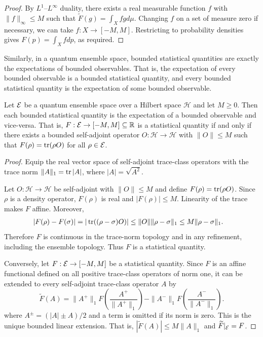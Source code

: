 \begin{mathSection}
\begin{proof}
	By $L^1$--$L^\infty$ duality, there exists a real measurable function $f$ with $\|f\|_\infty \leq M$ such that $\widetilde{F}(g)=\int_X f g d\mu$. Changing $f$ on a set of measure zero if necessary, we can take $f : X \to [-M,M]$. Restricting to probability densities gives $F(p)=\int_X f dp$, as required.
\end{proof}
\end{mathSection}

Similarly, in a quantum ensemble space, bounded statistical quantities are exactly the expectations of bounded observables. That is, the expectation of every bounded observable is a bounded statistical quantity, and every bounded statistical quantity is the expectation of some bounded observable.

\begin{mathSection}
\begin{prop}
	Let $\mathcal{E}$ be a quantum ensemble space over a Hilbert space $\mathcal{H}$ and let $M \geq 0$. Then each bounded statistical quantity is the expectation of a bounded observable and vice-versa. That is, $F : \mathcal{E} \to [-M,M] \subseteq \mathbb{R}$ is a statistical quantity if and only if there exists a bounded self-adjoint operator $O : \mathcal{H} \to \mathcal{H}$ with $\|O\| \leq M$ such that $F(\rho) = \operatorname{tr}(\rho O)$ for all $\rho \in \mathcal{E}$.
\end{prop}

\begin{proof}
	Equip the real vector space of self-adjoint trace-class operators with the trace norm $\|A\|_1=\operatorname{tr} |A|$, where $|A|=\sqrt{A^2}$.
	
	Let $O : \mathcal{H} \to \mathcal{H}$ be self-adjoint with $\|O\| \leq M$ and define $F(\rho)=\operatorname{tr}(\rho O)$. Since $\rho$ is a density operator, $F(\rho)$ is real and $|F(\rho)| \leq M$. Linearity of the trace makes $F$ affine. Moreover,
	\begin{equation}
		\begin{aligned}
			|F(\rho)-F(\sigma)| &= |\operatorname{tr}((\rho-\sigma)O)| \leq \|O\| \|\rho-\sigma\|_1 \leq M \|\rho-\sigma\|_1.
		\end{aligned}
	\end{equation}
	Therefore $F$ is continuous in the trace-norm topology and in any refinement, including the ensemble topology. Thus $F$ is a statistical quantity.
	
	Conversely, let $F : \mathcal{E} \to [-M,M]$ be a statistical quantity. Since $F$ is an affine functional defined on all positive trace-class operators of norm one, it can be extended to every self-adjoint trace-class operator $A$ by
	\begin{equation}
		\widetilde{F}(A) = \|A^+\|_1 F\left(\frac{A^+}{\|A^+\|_1}\right)-\|A^-\|_1 F\left(\frac{A^-}{\|A^-\|_1}\right).
	\end{equation}
	where $A^\pm=(|A|\pm A)/2$ and a term is omitted if its norm is zero. This is the unique bounded linear extension. That is, $|\widetilde F(A)|\le M\|A\|_1$ and $\widetilde{F}|_{\mathcal{E}} = F$.
	

\end{proof}
\end{mathSection}
